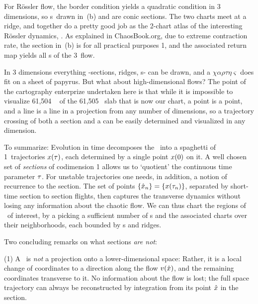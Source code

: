 \documentclass[aip,cha,reprint,
secnumarabic,
nofootinbib, tightenlines,
nobibnotes, showkeys, showpacs,
groupedaddress
]{revtex4-1}
\begin{document}
For R\"ossler flow, the border condition  yields a
quadratic condition in 3 dimensions, so \poincBord s\ drawn in
\,(b) and  are conic
sections. The two charts meet at a ridge, and together do a pretty good
job as the 2-chart atlas of the interesting R\"ossler dynamics,
. As explained in ChaosBook.org\cite{DasBuch}, due
to extreme contraction rate, the section in \,(b)
is for all practical purposes 1\dmn, and the associated return map yields
all \po s of the 3\dmn\ flow.

In 3 dimensions everything -sections, ridges, \poincBord s- can be
drawn, and a $\chi\alpha\rho\tau\eta\varsigma$ does fit on a sheet of
papyrus. But what about high-dimensional flows? The point of the
cartography enterprize undertaken here is that while it is impossible to
visualize  61,504%
\dmn\ {\poincBord} of the 61,505%
\dmn\ slab that is now our chart, a point is a point,
and a line is a line in a projection from any number of dimensions, so a
trajectory crossing of both a section and a {\poincBord} can be easily
determined and visualized in any dimension.

To summarize:
Evolution in time decomposes the \statesp\ into a spaghetti of 1\dmn\
trajectories $x(\tau)$, each determined by a single point $x(0)$
on it. A well chosen set of \emph{sections} of codimension 1 allows us to
`quotient' the continuous time parameter $\tau$. For unstable
trajectories one needs, in addition, a notion of recurrence to the
section. The set of points $\{\hat{x}_n\} = \{x(\tau_n)\}$,  separated
by short-time section to section flights, then captures the transverse
dynamics without losing any information about the chaotic flow.
We can thus chart the regions of \statesp\ of interest, by a picking a
sufficient number of \template s and the associated charts over their
neighborhoods, each bounded by \poincBord s and ridges.

Two concluding remarks on what sections \emph{are not}:

(1) A \PoincSec\ is {\em not} a projection onto a
lower-dimensional space: Rather, it is a local change of coordinates to a
direction along the flow $v(\hat{x})$, and the remaining coordinates
transverse to it. No information about the flow is lost; the full space
trajectory can always be reconstructed by integration from its point
$\hat{x}$ in the section.
\end{document}
